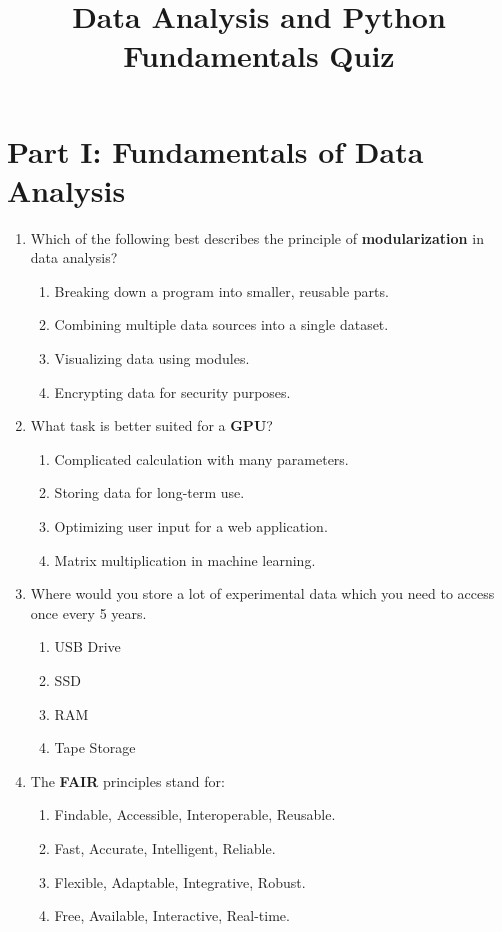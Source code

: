 \documentclass[twocolumn]{article}
\begin{document}
\title{Data Analysis and Python Fundamentals Quiz}
\author{}
\date{}
\maketitle

\section*{Part I: Fundamentals of Data Analysis}

\begin{enumerate}

\item Which of the following best describes the principle of \textbf{modularization} in data analysis?
\begin{enumerate}
    \item Breaking down a program into smaller, reusable parts.
    \item Combining multiple data sources into a single dataset.
    \item Visualizing data using modules.
    \item Encrypting data for security purposes.
\end{enumerate}

\item What task is better suited for a \textbf{GPU}?
\begin{enumerate}
    \item Complicated calculation with many parameters. 
    \item Storing data for long-term use.
    \item Optimizing user input for a web application.
    \item Matrix multiplication in machine learning.
\end{enumerate}

\item Where would you store a lot of experimental data which you need to access
once every 5 years. 
\begin{enumerate}
    \item USB Drive 
    \item SSD 
    \item RAM 
    \item Tape Storage 
\end{enumerate}

\item The \textbf{FAIR} principles stand for:
\begin{enumerate}
    \item Findable, Accessible, Interoperable, Reusable.
    \item Fast, Accurate, Intelligent, Reliable.
    \item Flexible, Adaptable, Integrative, Robust.
    \item Free, Available, Interactive, Real-time.
\end{enumerate}


\end{enumerate}
\end{document}
